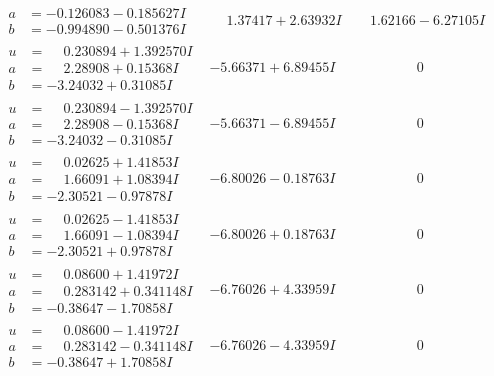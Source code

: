 \documentclass[1p]{elsarticle_modified}
\theoremstyle{definition}
\begin{document}
$$\begin{array}{c|c|c}
\begin{aligned}
a &= -0.126083 - 0.185627 I \\
b &= -0.994890 - 0.501376 I\end{aligned}
 & \phantom{-}1.37417 + 2.63932 I & \phantom{-}1.62166 - 6.27105 I \\ \hline\begin{aligned}
u &= \phantom{-}0.230894 + 1.392570 I \\
a &= \phantom{-}2.28908 + 0.15368 I \\
b &= -3.24032 + 0.31085 I\end{aligned}
 & -5.66371 + 6.89455 I & \phantom{-0.000000 } 0 \\ \hline\begin{aligned}
u &= \phantom{-}0.230894 - 1.392570 I \\
a &= \phantom{-}2.28908 - 0.15368 I \\
b &= -3.24032 - 0.31085 I\end{aligned}
 & -5.66371 - 6.89455 I & \phantom{-0.000000 } 0 \\ \hline\begin{aligned}
u &= \phantom{-}0.02625 + 1.41853 I \\
a &= \phantom{-}1.66091 + 1.08394 I \\
b &= -2.30521 - 0.97878 I\end{aligned}
 & -6.80026 - 0.18763 I & \phantom{-0.000000 } 0 \\ \hline\begin{aligned}
u &= \phantom{-}0.02625 - 1.41853 I \\
a &= \phantom{-}1.66091 - 1.08394 I \\
b &= -2.30521 + 0.97878 I\end{aligned}
 & -6.80026 + 0.18763 I & \phantom{-0.000000 } 0 \\ \hline\begin{aligned}
u &= \phantom{-}0.08600 + 1.41972 I \\
a &= \phantom{-}0.283142 + 0.341148 I \\
b &= -0.38647 - 1.70858 I\end{aligned}
 & -6.76026 + 4.33959 I & \phantom{-0.000000 } 0 \\ \hline\begin{aligned}
u &= \phantom{-}0.08600 - 1.41972 I \\
a &= \phantom{-}0.283142 - 0.341148 I \\
b &= -0.38647 + 1.70858 I\end{aligned}
 & -6.76026 - 4.33959 I & \phantom{-0.000000 } 0 \\ \hline\begin{aligned}

\end{aligned}
\end{array}$$
\end{document}
